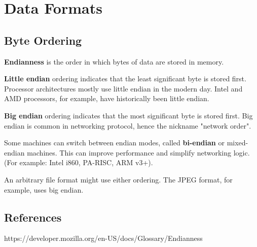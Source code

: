 \chapter{Data Formats}

\section{Byte Ordering}

\textbf{Endianness} is the order in which bytes of data are stored in memory.

\textbf{Little endian} ordering indicates that the least significant byte is stored first. Processor architectures mostly use little endian in the modern day. Intel and AMD processors, for example, have historically been little endian.

\textbf{Big endian} ordering indicates that the most significant byte is stored first. Big endian is common in networking protocol, hence the nickname "network order".

Some machines can switch between endian modes, called \textbf{bi-endian} or {mixed-endian} machines. This can improve performance and simplify networking logic. (For example: Intel i860, PA-RISC, ARM v3+).

An arbitrary file format might use either ordering. The JPEG format, for example, uses big endian.

\section{References}

https://developer.mozilla.org/en-US/docs/Glossary/Endianness


